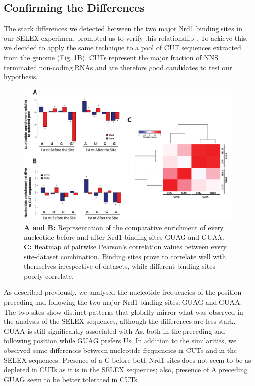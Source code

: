\subsection{Confirming the Differences \invivo{}}

The stark differences we detected between the two major Nrd1 binding sites in our SELEX experiment prompted us to verify this relationship \invivo{}. To achieve this, we decided to apply the same technique to a pool of CUT sequences extracted from the genome (Fig. \ref{fig:flanking}B). CUTs represent the major fraction of NNS terminated non-coding RNAs and are therefore good candidates to test our hypothesis.

\begin{figure}[h!]

\centering
\includegraphics[width=\textwidth]{figures/results/gtagGtaaFlanking}
\caption[Comparison of flanking nucleotides between GUAG and GUAA in SELEX and genomic CUT sequences]{\textbf{A and B: }Representation of the comparative enrichment of every nucleotide before and after Nrd1 binding sites GUAG and GUAA.  \textbf{C: }Heatmap of pairwise Pearson's correlation values between every site-dataset combination. Binding sites prove to correlate well with themselves irrespective of datasets, while different binding sites poorly correlate.}
\label{fig:flanking}

\end{figure} 

As described previously, we analysed the nucleotide frequencies of the position preceding and following the two major Nrd1 binding sites: GUAG and GUAA. The two sites show distinct patterns that globally mirror what was observed in the analysis of the SELEX sequences, although the differences are less stark. GUAA is still significantly associated with As, both in the preceding and following position while GUAG prefers Us. In addition to the similarities, we observed some differences between nucleotide frequencies in CUTs and in the SELEX sequences. Presence of a G before both Nrd1 sites does not seem to be as depleted in CUTs as it is in the SELEX sequences; also, presence of A preceding GUAG seem to be better tolerated in CUTs. 

